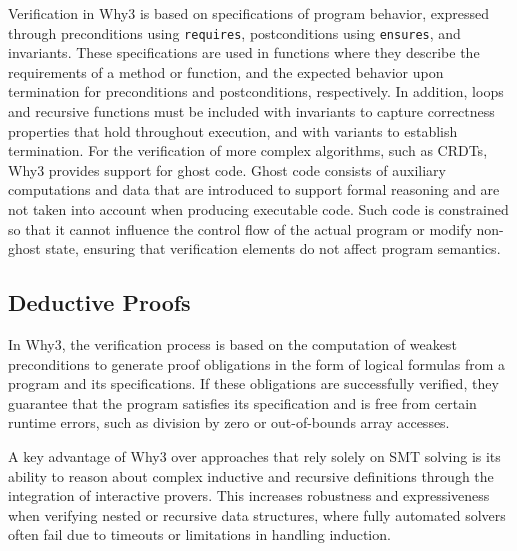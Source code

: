 Verification in Why3 is based on specifications of program behavior, expressed through preconditions using \texttt{requires}, postconditions using \texttt{ensures}, and invariants. These specifications are used in functions where they describe the requirements of a method or function, and the expected behavior upon termination for preconditions and postconditions, respectively. In addition, loops and recursive functions must be included with invariants to capture correctness properties that hold throughout execution, and with variants to establish termination. For the verification of more complex algorithms, such as CRDTs, Why3 provides support for ghost code. Ghost code consists of auxiliary computations and data that are introduced to support formal reasoning and are not taken into account when producing executable code. Such code is constrained so that it cannot influence the control flow of the actual program or modify non-ghost state, ensuring that verification elements do not affect program semantics.

\subsection{Deductive Proofs}
\label{sub:deductive_proofs}

In Why3, the verification process is based on the computation of weakest preconditions to generate proof obligations in the form of logical formulas from a program and its specifications. If these obligations are successfully verified, they guarantee that the program satisfies its specification and is free from certain runtime errors, such as division by zero or out-of-bounds array accesses.

A key advantage of Why3 over approaches that rely solely on SMT solving is its ability to reason about complex inductive and recursive definitions through the integration of interactive provers. This increases robustness and expressiveness when verifying nested or recursive data structures, where fully automated solvers often fail due to timeouts or limitations in handling induction.
